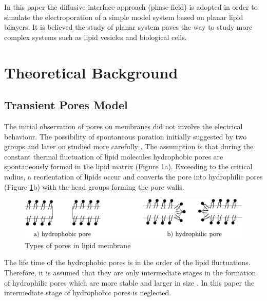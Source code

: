 \documentclass[english,12pt]{article}
\begin{document}
In this paper the diffusive interface approach (phase-field) is adopted in order to simulate the electroporation of a simple model system based on planar lipid bilayers. It is believed the study of planar system paves the way to study more complex systems such as lipid vesicles and biological cells.
%      


\section{Theoretical Background}
\subsection{Transient Pores Model}
The initial observation of pores on membranes did not involve the electrical behaviour. The possibility of spontaneous poration initially suggested by two groups and later on studied more carefully  \citep{karatekin2003cascades, Sandre}. The assumption is that during the constant thermal fluctuation of lipid molecules hydrophobic pores are spontaneously formed in the lipid matrix (Figure \ref{fig:pores}a). Exceeding to the critical radius, a reorientation of lipids occur and converts the pore into hydrophilic pores (Figure \ref{fig:pores}b) with the head groups forming the pore walls. 
\begin{figure}[H]
	\centering
	\includegraphics[scale=0.8]{pics/pores.pdf}
	\caption{Types of pores in lipid membrane}
	\label{fig:pores}
\end{figure}
The life time of the hydrophobic pores is in the order of the lipid fluctuations. Therefore, it is assumed that they are only intermediate stages in the formation of hydrophilic pores which are more stable and larger in size \citep{glaser1988reversible}. In this paper the intermediate stage of hydrophobic pores is neglected.
\end{document}
